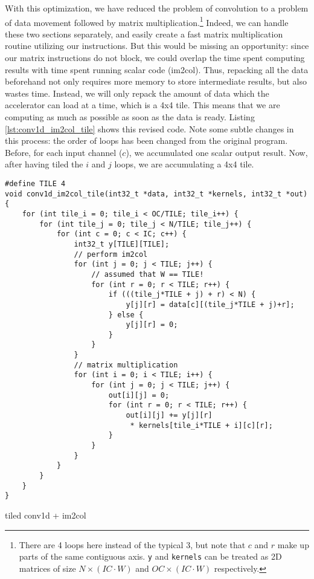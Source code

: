 \documentclass[acmsmall, nonacm=true]{acmart}
\begin{document}
With this optimization, we have reduced the problem of convolution to a problem of data movement followed by matrix multiplication.\footnote{There are 4 loops here instead of the typical 3, but note that $c$ and $r$ make up parts of the same contiguous axis. \texttt{y} and \texttt{kernels} can be treated as 2D matrices of size $N\times (IC\cdot W)$ and $OC\times (IC\cdot W)$ respectively.} Indeed, we can handle these two sections separately, and easily create a fast matrix multiplication routine utilizing our instructions. But this would be missing an opportunity: since our matrix instructions do not block, we could overlap the time spent computing results with time spent running scalar code (im2col). Thus, repacking all the data beforehand not only requires more memory to store intermediate results, but also wastes time. Instead, we will only repack the amount of data which the accelerator can load at a time, which is a 4x4 tile. This means that we are computing as much as possible as soon as the data is ready. Listing \ref{lst:conv1d_im2col_tile} shows this revised code. Note some subtle changes in this process: the order of loops has been changed from the original program. Before, for each input channel ($c$), we accumulated one scalar output result. Now, after having tiled the $i$ and $j$ loops, we are accumulating a 4x4 tile.

\begin{listing}
    \centering
    \begin{verbatim}
#define TILE 4
void conv1d_im2col_tile(int32_t *data, int32_t *kernels, int32_t *out) {
    for (int tile_i = 0; tile_i < OC/TILE; tile_i++) {
        for (int tile_j = 0; tile_j < N/TILE; tile_j++) {
            for (int c = 0; c < IC; c++) {
                int32_t y[TILE][TILE];
                // perform im2col
                for (int j = 0; j < TILE; j++) {
                    // assumed that W == TILE!
                    for (int r = 0; r < TILE; r++) {
                        if (((tile_j*TILE + j) + r) < N) {
                            y[j][r] = data[c][(tile_j*TILE + j)+r];
                        } else {
                            y[j][r] = 0;
                        }                    
                    }
                }
                // matrix multiplication
                for (int i = 0; i < TILE; i++) {
                    for (int j = 0; j < TILE; j++) {
                        out[i][j] = 0;
                        for (int r = 0; r < TILE; r++) {
                            out[i][j] += y[j][r] 
                             * kernels[tile_i*TILE + i][c][r];
                        }
                    }
                }
            }
        }
    }
}
\end{verbatim}
    \caption{tiled conv1d + im2col}
    \label{lst:conv1d_im2col_tile}
\end{listing}
\end{document}
